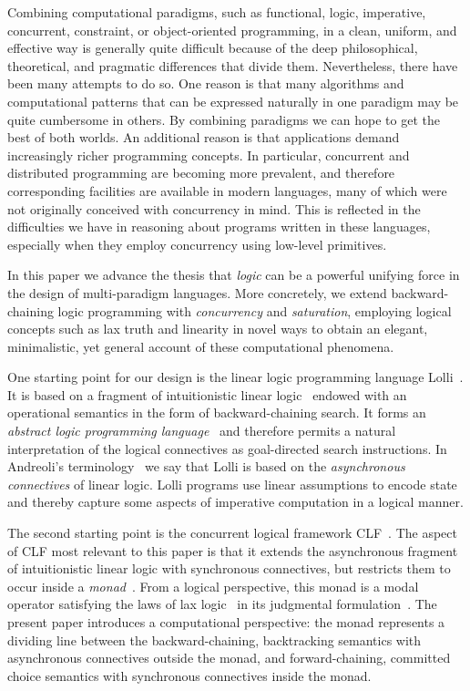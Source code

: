 \documentclass{sig-alt}
\begin{document}
Combining computational paradigms, such as functional, logic,
imperative, concurrent, constraint, or ob\-ject-oriented programming, in
a clean, uniform, and effective way is generally quite difficult
because of the deep philosophical, theoretical, and pragmatic
differences that divide them.  Nevertheless, there have been many
attempts to do so.  One reason is that many algorithms and
computational patterns that can be expressed naturally in one paradigm
may be quite cumbersome in others.  By combining paradigms we can hope
to get the best of both worlds.  An additional reason is that
applications demand increasingly richer programming concepts.  In
particular, concurrent and distributed programming are becoming more
prevalent, and therefore corresponding facilities are available in
modern languages, many of which were not originally conceived with
concurrency in mind.  This is reflected in the difficulties we have in
reasoning about programs written in these languages, especially when
they employ concurrency using low-level primitives.

In this paper we advance the thesis that \emph{logic} can be a
powerful unifying force in the design of multi-paradigm languages.
More concretely, we extend back\-ward-chaining logic programming with
\emph{concurrency} and \emph{saturation}, employing logical concepts
such as lax truth and linearity in novel ways to obtain an elegant,
minimalistic, yet general account of these computational phenomena.

One starting point for our design is the linear logic programming
language Lolli~\cite{Hodas94ic}.  It is based on a fragment of
intuitionistic linear logic~\cite{Girard87tcs} endowed with an
operational semantics in the form of backward-chaining search.  It forms
an \emph{abstract logic programming language}~\cite{Miller91apal} and
therefore permits a natural interpretation of the logical connectives as
goal-directed search instructions.  In Andreoli's
terminology~\cite{Andreoli92} we say that Lolli is based on the
\emph{asynchronous connectives} of linear logic.  Lolli programs use
linear assumptions to encode state and thereby capture some
aspects of imperative computation in a logical manner.

The second starting point is the concurrent logical framework
CLF~\cite{Cervesato02tr,Watkins02tr,Watkins04types}.  The aspect of
CLF most relevant to this paper is that it extends the asynchronous
fragment of intuitionistic linear logic with syn\-chro\-nous
connectives, but restricts them to occur inside a
\emph{monad}~\cite{Moggi91}.  From a logical perspective, this monad
is a modal operator satisfying the laws of lax
logic~\cite{Fairtlough97ic} in its judgmental
formulation~\cite{Pfenning01mscs}.
The present paper introduces a computational perspective:
the monad represents a dividing line between
the backward-chaining, backtracking semantics with asynchronous
connectives outside the monad, and forward-chaining, committed choice
semantics with synchronous connectives inside the monad.
\end{document}
